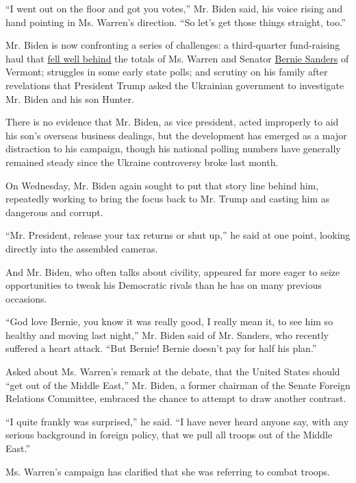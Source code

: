 ``I went out on the floor and got you votes,'' Mr. Biden said, his voice
rising and hand pointing in Ms. Warren's direction. ``So let's get those
things straight, too.''

Mr. Biden is now confronting a series of challenges: a third-quarter
fund-raising haul that
\href{https://www.nytimes.com/interactive/2019/10/16/us/elections/democratic-q3-fundraising.html}{fell
well behind} the totals of Ms. Warren and Senator
\href{https://www.nytimes.com/interactive/2020/us/elections/bernie-sanders.html}{Bernie
Sanders} of Vermont; struggles in some early state polls; and scrutiny
on his family after revelations that President Trump asked the Ukrainian
government to investigate Mr. Biden and his son Hunter.

There is no evidence that Mr. Biden, as vice president, acted improperly
to aid his son's overseas business dealings, but the development has
emerged as a major distraction to his campaign, though his national
polling numbers have generally remained steady since the Ukraine
controversy broke last month.

On Wednesday, Mr. Biden again sought to put that story line behind him,
repeatedly working to bring the focus back to Mr. Trump and casting him
as dangerous and corrupt.

``Mr. President, release your tax returns or shut up,'' he said at one
point, looking directly into the assembled cameras.

And Mr. Biden, who often talks about civility, appeared far more eager
to seize opportunities to tweak his Democratic rivals than he has on
many previous occasions.

``God love Bernie, you know it was really good, I really mean it, to see
him so healthy and moving last night,'' Mr. Biden said of Mr. Sanders,
who recently suffered a heart attack. ``But Bernie! Bernie doesn't pay
for half his plan.''

Asked about Ms. Warren's remark at the debate, that the United States
should ``get out of the Middle East,'' Mr. Biden, a former chairman of
the Senate Foreign Relations Committee, embraced the chance to attempt
to draw another contrast.

``I quite frankly was surprised,'' he said. ``I have never heard anyone
say, with any serious background in foreign policy, that we pull all
troops out of the Middle East.''

Ms. Warren's campaign has clarified that she was referring to combat
troops.

